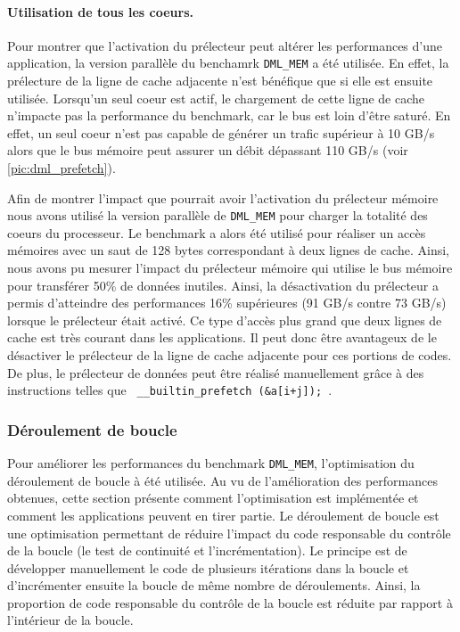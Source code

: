         
        
         
        \paragraph{Utilisation de tous les coeurs.} 
            
            Pour montrer que l'activation du prélecteur peut altérer les performances d'une application, la version parallèle du benchamrk \verb=DML_MEM= a été utilisée. En effet, la prélecture de la ligne de cache adjacente n'est bénéfique que si elle est ensuite utilisée. Lorsqu'un seul coeur est actif, le chargement de cette ligne de cache n'impacte pas la performance du benchmark, car le bus est loin d'être saturé. En effet, un seul coeur n'est pas capable de générer un trafic supérieur à 10 GB/s alors que le bus mémoire peut assurer un débit dépassant 110 GB/s (voir \autoref{pic:dml_prefetch}). 
            
            Afin de montrer l'impact que pourrait avoir l'activation du prélecteur mémoire nous avons utilisé la version parallèle de \verb=DML_MEM= pour charger la totalité des coeurs du processeur. Le benchmark a alors été utilisé pour réaliser un accès mémoires avec un saut de 128 bytes correspondant à deux lignes de cache. Ainsi, nous avons pu mesurer l'impact du prélecteur mémoire qui utilise le bus mémoire pour transférer 50\% de données inutiles. Ainsi, la désactivation du prélecteur a permis d'atteindre des performances 16\% supérieures (91 GB/s contre 73 GB/s) lorsque le prélecteur était activé. Ce type d'accès plus grand que deux lignes de cache est très courant dans les applications. Il peut donc être avantageux de le désactiver le prélecteur de la ligne de cache adjacente pour ces portions de codes. De plus, le prélecteur de données peut être réalisé manuellement grâce à des instructions telles que \verb| __builtin_prefetch (&a[i+j]); |.





    
    \subsubsection{Déroulement de boucle} \label{sec:dml_unroll}
    Pour améliorer les performances du benchmark \verb=DML_MEM=, l'optimisation du déroulement de boucle à été utilisée. Au vu de l'amélioration des performances obtenues, cette section présente comment l'optimisation est implémentée et comment les applications peuvent en tirer partie. 
    Le déroulement de boucle est une optimisation permettant de réduire l'impact du code responsable du contrôle de la boucle (le test de continuité et l'incrémentation). Le principe est de développer manuellement le code de plusieurs itérations dans la boucle et d'incrémenter ensuite la boucle de même nombre de déroulements. Ainsi, la proportion de code responsable du contrôle de la boucle est réduite par rapport à l'intérieur de la boucle. 
    
